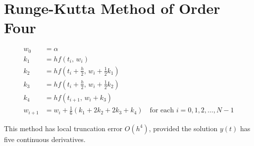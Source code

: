 \documentclass[../main-sheet.tex]{subfiles}
\begin{document}
\section{Runge-Kutta Method of Order Four}
\begin{align*}
    w_0&=\alpha\\
    k_1&=hf(t_i,\,w_i)\\
    k_2&=hf\left(t_i+\frac{h}{2},\,w_i+\frac{1}{2}k_1\right)\\
    k_3&=hf\left(t_i+\frac{h}{2},\,w_i+\frac{1}{2}k_2\right)\\
    k_4&=hf\left(t_{i+1},\,w_i+k_3\right)\\
    w_{i+1}&=w_i+\frac{1}{6}(k_1+2k_2+2k_3+k_4) \quad \text{for each } i=0,1,2,\dots,N-1
\end{align*}
\begin{note}
    This method has local truncation error \(O(h^4)\), provided the solution \(y(t)\) has five continuous derivatives.
\end{note}
\end{document}
